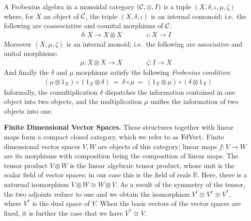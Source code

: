 \documentclass[a4paper,11pt]{easychair}
\begin{document}
A Frobenius algebra  in a   monoidal  category $({\cal
  C}, \otimes, I)$ is a tuple $(X,  \delta, \iota, \mu, \zeta)$ where,
for $X$ an object of ${\cal C}$, the triple $(X, \delta, \iota)$ is  an internal comonoid; 
i.e.~the following are  coassociative and counital  morphisms of ${\cal
  C}$:
\begin{align*}
\delta \colon X \to X \otimes X&\qquad& \iota \colon X \to I
\end{align*}
Moreover $(X, \mu, \zeta)$ is  an internal  monoid; i.e.~the following are  associative and unital  morphisms:
\begin{align*}
\mu \colon  X \otimes X \to X  &\qquad& \zeta \colon I \to X
\end{align*}
And finally the  $\delta$ and $\mu$ morphisms satisfy the
following \emph{Frobenius condition}:
\begin{align*}
\mbox{ $(\mu \otimes 1_X) \circ (1_X \otimes \delta) \ = \  \delta \circ \mu  \ = \  (1_X \otimes \mu) \circ (\delta \otimes 1_X)$}
\end{align*}
Informally, the  comultiplication $\delta$  dispatches the information contained in
one object into two objects, and the  multiplication $\mu$ unifies  the
information of two objects into one.


\medskip
\noindent
{\bf Finite Dimensional Vector Spaces.}
These structures  together with  linear maps  form a compact
closed category, which we refer to as $\mathrm{FdVect}$.  Finite dimensional
vector spaces $V, W$ are objects of this category; linear maps $f
\colon V \to W$ are its morphisms with composition being the
composition of linear maps. The tensor product $V
\otimes W$ is the 
linear algebraic tensor product,
whose unit is the scalar
field of vector spaces; in our case this is the field of reals
$\mathbb{R}$.  Here, there is  a naturual
isomorphism $V \otimes W \cong W \otimes V$. As a result of the
symmetry of the tensor, the two adjoints reduce to one and we obtain the  isomorphism $V^l \cong V^r \cong V^*$, 
where $V^*$ is the dual space of $V$. When the
basis vectors of the vector spaces are fixed, it is further the case
that we have $V^* \cong V$.
\end{document}
